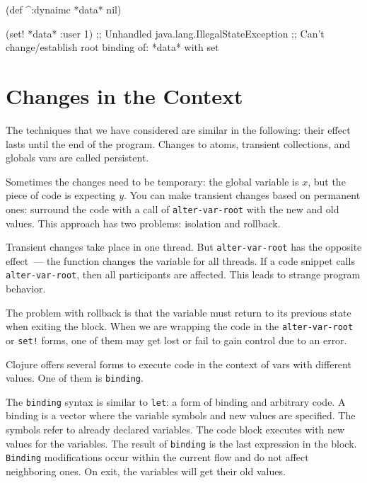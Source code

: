 \else

\begin{english}
  \begin{clojure}
(def ^:dynaimc *data* nil)

(set! *data* {:user 1})
;; Unhandled java.lang.IllegalStateException
;; Can't change/establish root binding of: *data* with set
  \end{clojure}
\end{english}

\fi

\section{Changes in the Context}


The techniques that we have considered are similar in the following: their effect lasts until the end of the program.
Changes to atoms, transient collections, and globals vars are called persistent.

Sometimes the changes need to be temporary: the global variable is $x$, but the piece of code is expecting $y$.
You can make transient changes based on permanent ones: surround the code with a call of \verb|alter-var-root| with the new and old values.
This approach has two problems: isolation and rollback.


Transient changes take place in one thread.
But \verb|alter-var-root| has the opposite effect~--- the function changes the variable for all threads.
If a code snippet calls \verb|alter-var-root|, then all participants are affected.
This leads to strange program behavior.

The problem with rollback is that the variable must return to its previous state when exiting the block.
When we are wrapping the code in the \verb|alter-var-root| or \verb|set!| forms, one of them may get lost or fail to gain control due to an error.

Clojure offers several forms to execute code in the context of vars with different values.
One of them is \verb|binding|.


The \verb|binding| syntax is similar to \verb|let|: a form of binding and arbitrary code. A binding is a vector where the variable symbols and new values are specified.
The symbols refer to already declared variables.
The code block executes with new values for the variables.
The result of \verb|binding| is the last expression in the block.
\verb|Binding| modifications occur within the current flow and do not affect neighboring ones.
On exit, the variables will get their old values.

